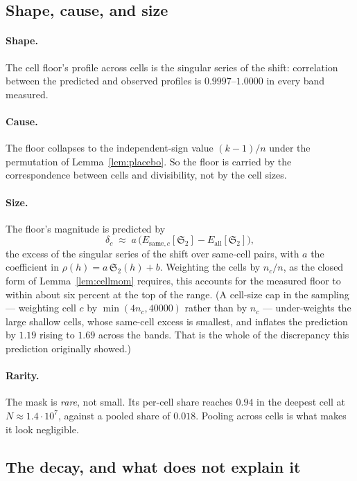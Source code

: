 \documentclass[11pt,a4paper]{article}
\theoremstyle{plain}
\theoremstyle{definition}
\renewcommand{\SS}{\mathfrak{S}}
\begin{document}
\subsection{Shape, cause, and size}

\paragraph{Shape.} The cell floor's profile across cells is the
singular series of the shift: correlation between the predicted and
observed profiles is $0.9997$--$1.0000$ in every band measured.

\paragraph{Cause.} The floor collapses to the independent-sign value
$(k-1)/n$ under the permutation of Lemma~\ref{lem:placebo}. So the
floor is carried by the correspondence between cells and divisibility,
not by the cell sizes.

\paragraph{Size.} The floor's magnitude is predicted by
\[
  \delta_c \;\approx\; a\,\bigl(E_{\mathrm{same},c}[\SS_2]
  - E_{\mathrm{all}}[\SS_2]\bigr),
\]
the excess of the singular series of the shift over same-cell pairs,
with $a$ the coefficient in $\rho(h) = a\,\SS_2(h)+b$. Weighting the
cells by $n_c/n$, as the closed form of Lemma~\ref{lem:cellmom}
requires, this accounts for the measured floor to within about six
percent at the top of the range. (A cell-size cap in the sampling ---
weighting cell $c$ by $\min(4n_c, 40000)$ rather than by $n_c$ ---
under-weights the large shallow cells, whose same-cell excess is
smallest, and inflates the prediction by $1.19$ rising to $1.69$ across
the bands. That is the whole of the discrepancy this prediction
originally showed.)

\paragraph{Rarity.} The mask is \emph{rare}, not small. Its per-cell
share reaches $0.94$ in the deepest cell at $N\approx1.4\cdot10^7$,
against a pooled share of $0.018$. Pooling across cells is what makes
it look negligible.

\subsection{The decay, and what does not explain it}
\end{document}

